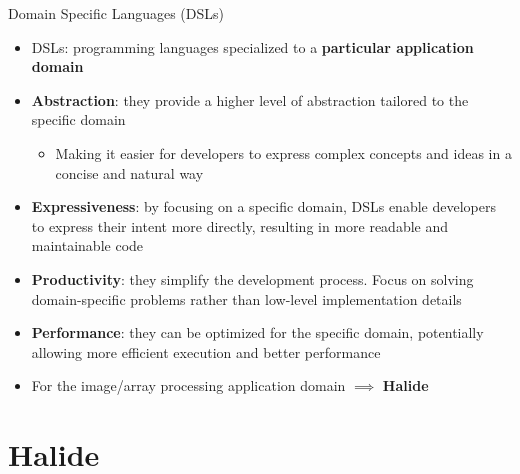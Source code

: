\documentclass[8pt,a4paper,oneside,hidelinks,aspectratio=169,dvipsnames]{beamer}
\begin{document}
\begin{frame}{Domain Specific Languages (DSLs)}
  \begin{itemize}
    \item DSLs: programming languages specialized to a \textbf{particular application domain}
    \item \textbf{Abstraction}: they provide a higher level of abstraction tailored to the specific domain
          \begin{itemize}
            \item Making it easier for developers to express complex concepts and ideas in a concise and natural way
          \end{itemize}
    \item \textbf{Expressiveness}: by focusing on a specific domain, DSLs enable developers to express their intent more directly, resulting in more readable and maintainable code
    \item \textbf{Productivity}: they simplify the development process. Focus on solving domain-specific problems rather than low-level implementation details
    \item \textbf{Performance}: they can be optimized for the specific domain, potentially allowing more efficient execution and better performance
    \item For the image/array processing application domain $\implies$ \textbf{Halide}
  \end{itemize}
\end{frame}

\section{Halide}
\end{document}
